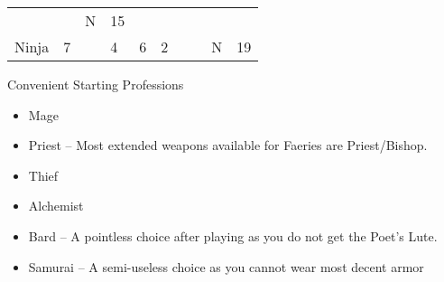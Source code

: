 \documentclass[12pt]{article}
\begin{document}
\begin{longtable}[]{@{}llllllllll@{}}
\begin{minipage}[t]{0.06\columnwidth}
\strut\end{minipage} &
\begin{minipage}[t]{0.06\columnwidth}\raggedright\strut
\strut\end{minipage} &
\begin{minipage}[t]{0.07\columnwidth}\raggedright\strut
N
\strut\end{minipage} &
\begin{minipage}[t]{0.08\columnwidth}\raggedright\strut
15
\strut\end{minipage}\tabularnewline
\begin{minipage}[t]{0.13\columnwidth}\raggedright\strut
Ninja
\strut\end{minipage} &
\begin{minipage}[t]{0.06\columnwidth}\raggedright\strut
7
\strut\end{minipage} &
\begin{minipage}[t]{0.06\columnwidth}\raggedright\strut
\strut\end{minipage} &
\begin{minipage}[t]{0.06\columnwidth}\raggedright\strut
4
\strut\end{minipage} &
\begin{minipage}[t]{0.06\columnwidth}\raggedright\strut
6
\strut\end{minipage} &
\begin{minipage}[t]{0.06\columnwidth}\raggedright\strut
2
\strut\end{minipage} &
\begin{minipage}[t]{0.06\columnwidth}\raggedright\strut
\strut\end{minipage} &
\begin{minipage}[t]{0.06\columnwidth}\raggedright\strut
\strut\end{minipage} &
\begin{minipage}[t]{0.07\columnwidth}\raggedright\strut
N
\strut\end{minipage} &
\begin{minipage}[t]{0.08\columnwidth}\raggedright\strut
19
\strut\end{minipage}\tabularnewline
\bottomrule
\end{longtable}

Convenient Starting Professions

\begin{itemize}
\item
  Mage
\item
  Priest -- Most extended weapons available for Faeries are
  Priest/Bishop.
\item
  Thief
\item
  Alchemist
\item
  Bard -- A pointless choice after playing as you do not get the Poet's
  Lute.
\item
  Samurai -- A semi-useless choice as you cannot wear most decent armor
\end{itemize}
\end{document}
